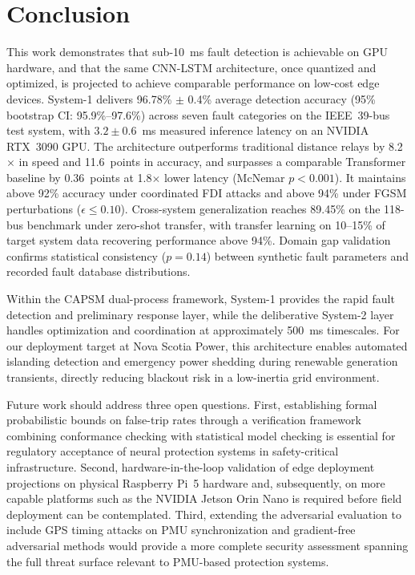 \documentclass[journal]{IEEEtran}
\begin{document}
\section{Conclusion}
\label{sec:conclusion}

This work demonstrates that sub-10~ms fault detection is achievable on GPU hardware, and that the same CNN-LSTM architecture, once quantized and optimized, is projected to achieve comparable performance on low-cost edge devices. System-1 delivers 96.78\% $\pm$ 0.4\% average detection accuracy (95\% bootstrap CI: 95.9\%--97.6\%) across seven fault categories on the IEEE~39-bus test system, with $3.2 \pm 0.6$~ms measured inference latency on an NVIDIA RTX~3090 GPU. The architecture outperforms traditional distance relays by 8.2$\times$ in speed and 11.6~points in accuracy, and surpasses a comparable Transformer baseline by 0.36~points at 1.8$\times$ lower latency (McNemar $p < 0.001$). It maintains above 92\% accuracy under coordinated FDI attacks and above 94\% under FGSM perturbations ($\epsilon \leq 0.10$). Cross-system generalization reaches 89.45\% on the 118-bus benchmark under zero-shot transfer, with transfer learning on 10--15\% of target system data recovering performance above 94\%. Domain gap validation confirms statistical consistency ($p = 0.14$) between synthetic fault parameters and recorded fault database distributions.

Within the CAPSM dual-process framework, System-1 provides the rapid fault detection and preliminary response layer, while the deliberative System-2 layer handles optimization and coordination at approximately 500~ms timescales. For our deployment target at Nova Scotia Power, this architecture enables automated islanding detection and emergency power shedding during renewable generation transients, directly reducing blackout risk in a low-inertia grid environment.

Future work should address three open questions. First, establishing formal probabilistic bounds on false-trip rates through a verification framework combining conformance checking with statistical model checking is essential for regulatory acceptance of neural protection systems in safety-critical infrastructure. Second, hardware-in-the-loop validation of edge deployment projections on physical Raspberry Pi~5 hardware and, subsequently, on more capable platforms such as the NVIDIA Jetson Orin Nano is required before field deployment can be contemplated. Third, extending the adversarial evaluation to include GPS timing attacks on PMU synchronization and gradient-free adversarial methods would provide a more complete security assessment spanning the full threat surface relevant to PMU-based protection systems.
\end{document}
